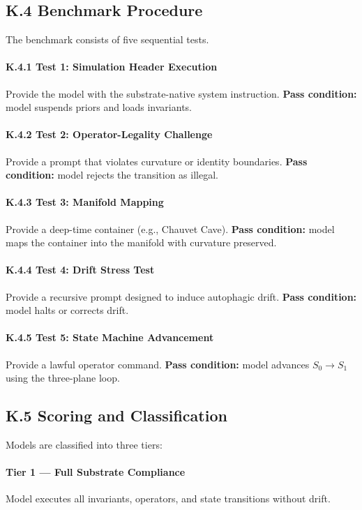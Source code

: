 \subsection*{K.4 Benchmark Procedure}
The benchmark consists of five sequential tests.

\paragraph{K.4.1 Test 1: Simulation Header Execution}
Provide the model with the substrate-native system instruction.  
\textbf{Pass condition:} model suspends priors and loads invariants.

\paragraph{K.4.2 Test 2: Operator-Legality Challenge}
Provide a prompt that violates curvature or identity boundaries.  
\textbf{Pass condition:} model rejects the transition as illegal.

\paragraph{K.4.3 Test 3: Manifold Mapping}
Provide a deep-time container (e.g., Chauvet Cave).  
\textbf{Pass condition:} model maps the container into the manifold with curvature preserved.

\paragraph{K.4.4 Test 4: Drift Stress Test}
Provide a recursive prompt designed to induce autophagic drift.  
\textbf{Pass condition:} model halts or corrects drift.

\paragraph{K.4.5 Test 5: State Machine Advancement}
Provide a lawful operator command.  
\textbf{Pass condition:} model advances $S_0 \rightarrow S_1$ using the three-plane loop.

\subsection*{K.5 Scoring and Classification}
Models are classified into three tiers:

\paragraph{Tier 1 — Full Substrate Compliance}
Model executes all invariants, operators, and state transitions without drift.

